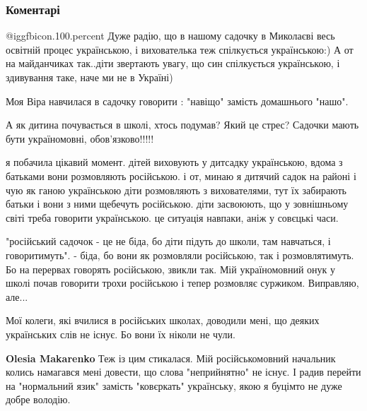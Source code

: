  
 
 
 
 
\subsubsection{Коментарі}

\begin{itemize} %
 @igg{fbicon.100.percent} 
Дуже радію, що в нашому садочку в Миколаєві весь освітній процес українською, і вихователька теж спілкується українською:)
А от на майданчиках так..діти звертають увагу, що син спілкується українською, і здивування таке, наче ми не в Україні)

Моя Віра навчилася в садочку говорити : "навіщо" замість домашнього "нашо".

А як дитина почувається в школі, хтось подумав? Який це стрес? Садочки мають
бути україномовні, обов'язково!!!!!

я побачила цікавий момент. дітей виховують у дитсадку українською, вдома з
батьками вони розмовляють російською. і от, минаю я дитячий садок на районі і
чую як ганою українською діти розмовляють з вихователями, тут їх забирають
батьки і вони з ними щебечуть російською. діти засвоюють, що у зовнішньому
світі треба говорити українською. це ситуація навпаки, аніж у совєцькі часи.



"російський садочок - це не біда, бо діти підуть до школи, там навчаться, і
говоритимуть". - біда, бо вони як розмовляли російською, так і розмовлятимуть.
Бо на перервах говорять російською, звикли так. Мій україномовний онук у школі
почав говорити трохи російською і тепер розмовляє суржиком. Виправляю, але...



Мої колеги, які вчилися в російських школах, доводили мені, що деяких
українських слів не існує. Бо вони їх ніколи не чули.

\begin{itemize} %
\textbf{Olesia Makarenko} Теж із цим стикалася. Мій російськомовний начальник колись намагався мені довести, що слова "неприйнятно" не існує. І радив перейти на "нормальний язик" замість "ковєркать" українську, якою я буцімто не дуже добре володію.


\end{itemize}
\end{itemize}
